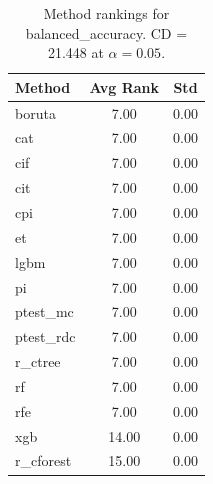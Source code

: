 \begin{table}[h]
\centering
\caption{Method rankings for balanced_accuracy. CD = 21.448 at $\alpha=0.05$.}
\label{tab:ranks_balanced_accuracy}
\begin{tabular}{lcc}
\toprule
Method & Avg Rank & Std \\
\midrule
boruta & 7.00 & 0.00 \\
cat & 7.00 & 0.00 \\
cif & 7.00 & 0.00 \\
cit & 7.00 & 0.00 \\
cpi & 7.00 & 0.00 \\
et & 7.00 & 0.00 \\
lgbm & 7.00 & 0.00 \\
pi & 7.00 & 0.00 \\
ptest_mc & 7.00 & 0.00 \\
ptest_rdc & 7.00 & 0.00 \\
r_ctree & 7.00 & 0.00 \\
rf & 7.00 & 0.00 \\
rfe & 7.00 & 0.00 \\
xgb & 14.00 & 0.00 \\
r_cforest & 15.00 & 0.00 \\
\bottomrule
\end{tabular}
\end{table}